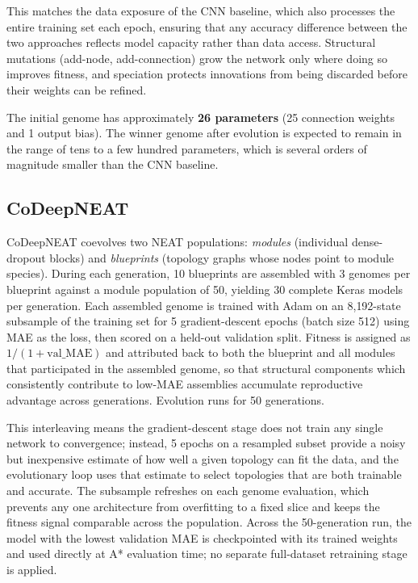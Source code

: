 This matches the data exposure of the CNN baseline, which also processes the entire training set each epoch, ensuring that any accuracy difference between the two approaches reflects model capacity rather than data access. Structural mutations (add-node, add-connection) grow the network only where doing so improves fitness, and speciation protects innovations from being discarded before their weights can be refined.

The initial genome has approximately \textbf{26 parameters} (25 connection weights and 1 output bias). The winner genome after evolution is expected to remain in the range of tens to a few hundred parameters, which is several orders of magnitude smaller than the CNN baseline.

\subsection{CoDeepNEAT}

CoDeepNEAT coevolves two NEAT populations: \textit{modules} (individual dense-dropout blocks) and \textit{blueprints} (topology graphs whose nodes point to module species). During each generation, 10 blueprints are assembled with 3 genomes per blueprint against a module population of 50, yielding 30 complete Keras models per generation. Each assembled genome is trained with Adam on an 8{,}192-state subsample of the training set for 5 gradient-descent epochs (batch size 512) using MAE as the loss, then scored on a held-out validation split. Fitness is assigned as $1/(1 + \text{val\_MAE})$ and attributed back to both the blueprint and all modules that participated in the assembled genome, so that structural components which consistently contribute to low-MAE assemblies accumulate reproductive advantage across generations. Evolution runs for 50 generations.

This interleaving means the gradient-descent stage does not train any single network to convergence; instead, 5 epochs on a resampled subset provide a noisy but inexpensive estimate of how well a given topology can fit the data, and the evolutionary loop uses that estimate to select topologies that are both trainable and accurate. The subsample refreshes on each genome evaluation, which prevents any one architecture from overfitting to a fixed slice and keeps the fitness signal comparable across the population. Across the 50-generation run, the model with the lowest validation MAE is checkpointed with its trained weights and used directly at A* evaluation time; no separate full-dataset retraining stage is applied.

